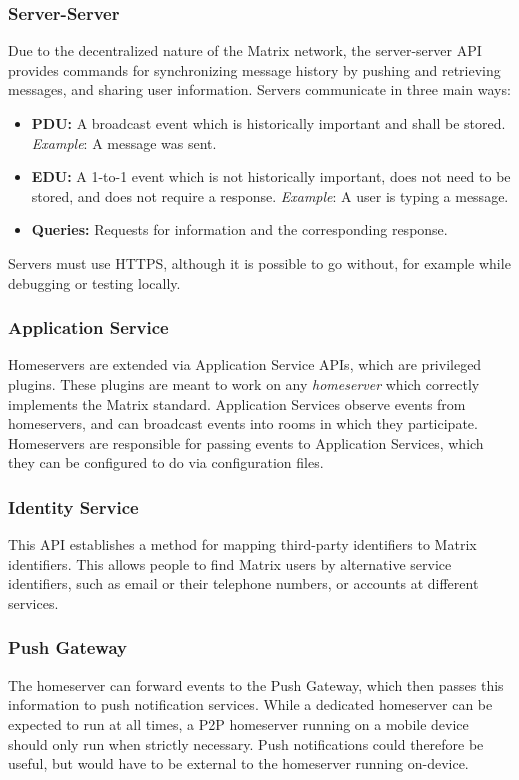 \subsubsection{Server-Server}
Due to the decentralized nature of the Matrix network, the server-server \ac{API} provides commands for synchronizing message history by pushing and retrieving messages, and sharing user information.
Servers communicate in three main ways:
\begin{itemize}
	\item{
	      \textbf{\ac{PDU}:}
	      A broadcast event which is historically important and shall be stored.
	      \textit{Example}: A message was sent.
	      }
	\item{
	      \textbf{\ac{EDU}:}
	      A 1-to-1 event which is not historically important, does not need to be stored, and does not require a response.
	      \textit{Example}: A user is typing a message.
	      }
	\item{
	      \textbf{Queries:}
	      Requests for information and the corresponding response.
	      }
\end{itemize}
Servers must use \ac{HTTPS}, although it is possible to go without, for example while debugging or testing locally.

\subsubsection{Application Service}
Homeservers are extended via Application Service \ac{API}s, which are privileged plugins.
These plugins are meant to work on any \textit{homeserver} which correctly implements the Matrix standard.
Application Services observe events from homeservers, and can broadcast events into rooms in which they participate.
Homeservers are responsible for passing events to Application Services, which they can be configured to do via configuration files.

\subsubsection{Identity Service}
This \ac{API} establishes a method for mapping third-party identifiers to Matrix identifiers.
This allows people to find Matrix users by alternative service identifiers, such as email or their telephone numbers, or accounts at different services.

\subsubsection{Push Gateway}
The homeserver can forward events to the Push Gateway, which then passes this information to push notification services.
While a dedicated homeserver can be expected to run at all times, a \ac{P2P} homeserver running on a mobile device should only run when strictly necessary.
Push notifications could therefore be useful, but would have to be external to the homeserver running on-device.


